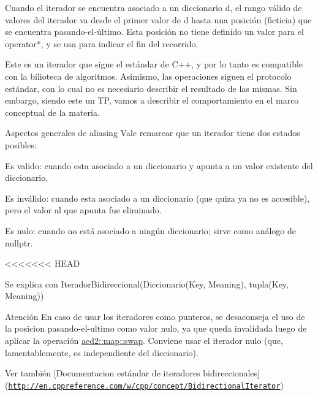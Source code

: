 Cuando el iterador se encuentra asociado a un diccionario {\ttfamily d}, el rango válido de valores del iterador va desde el primer valor de {\ttfamily d} hasta una posición (ficticia) que se encuentra pasando-\/el-\/último. Esta posición no tiene definido un valor para el {\ttfamily operator$\ast$}, y se usa para indicar el fin del recorrido.

Este es un iterador que sigue el estándar de C++, y por lo tanto es compatible con la bilioteca de algoritmos. Asimismo, las operaciones siguen el protocolo estándar, con lo cual no es necesiario describir el resultado de las mismas. Sin embargo, siendo este un TP, vamos a describir el comportamiento en el marco conceptual de la materia.

\begin{DoxyParagraph}{Aspectos generales de aliasing}
Vale remarcar que un iterador tiene dos estados posibles\+:
\begin{DoxyEnumerate}
\item Es valido\+: cuando esta asociado a un diccionario y apunta a un valor existente del diccionario,
\item Es inválido\+: cuando esta asociado a un diccionario (que quiza ya no es accesible), pero el valor al que apunta fue eliminado.
\item Es nulo\+: cuando no está asociado a ningún diccionario; sirve como análogo de {\ttfamily nullptr}. 
\end{DoxyEnumerate}
\end{DoxyParagraph}
<<<<<<< HEAD
\begin{DoxyParagraph}{\-Se explica con}
\-Iterador\-Bidireccional(\-Diccionario(\-Key, \-Meaning), tupla(\-Key, \-Meaning))
\end{DoxyParagraph}
\begin{DoxyAttention}{\-Atención}
\-En caso de usar los iteradores como punteros, se desaconseja el uso de la posicion pasando-\/el-\/ultimo como valor nulo, ya que queda invalidada luego de aplicar la operación \hyperlink{classaed2_1_1map_a43ddb71cc91e5c6021a7a1f243d6cc4a_a43ddb71cc91e5c6021a7a1f243d6cc4a}{aed2\-::map\-::swap}. \-Conviene usar el iterador nulo (que, lamentablemente, es independiente del diccionario).
\end{DoxyAttention}
\begin{DoxySeeAlso}{\-Ver también}
\mbox{[}\-Documentacion estándar de iteradores bidireccionales\mbox{]}(\href{http://en.cppreference.com/w/cpp/concept/BidirectionalIterator}{\tt http\-://en.\-cppreference.\-com/w/cpp/concept/\-Bidirectional\-Iterator}) 
\end{DoxySeeAlso}


